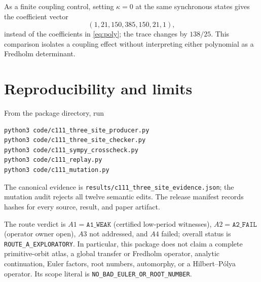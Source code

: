 \documentclass[10pt]{article}
\begin{document}
As a finite coupling control, setting $\kappa=0$ at the same synchronous
states gives the coefficient vector
\[
 (1,21,150,385,150,21,1),
\]
instead of the coefficients in \eqref{eq:poly}; the trace changes by
$138/25$. This comparison isolates a coupling effect without interpreting
either polynomial as a Fredholm determinant.
\section{Reproducibility and limits}
From the package directory, run
\begin{verbatim}
python3 code/c111_three_site_producer.py
python3 code/c111_three_site_checker.py
python3 code/c111_sympy_crosscheck.py
python3 code/c111_replay.py
python3 code/c111_mutation.py
\end{verbatim}
The canonical evidence is
\texttt{results/c111\_three\_site\_evidence.json}; the mutation audit rejects
all twelve semantic edits. The release manifest records hashes for every
source, result, and paper artifact.

The route verdict is $A1=\texttt{A1\_WEAK}$ (certified low-period witnesses),
$A2=\texttt{A2\_FAIL}$ (operator owner open), $A3$ not addressed, and $A4$
failed; overall status is \texttt{ROUTE\_A\_EXPLORATORY}. In particular, this
package does not claim a complete primitive-orbit atlas, a global transfer or
Fredholm operator, analytic continuation, Euler factors, root numbers,
automorphy, or a Hilbert--P\'olya operator. Its scope literal is
\texttt{NO\_BAD\_EULER\_OR\_ROOT\_NUMBER}.
\end{document}
